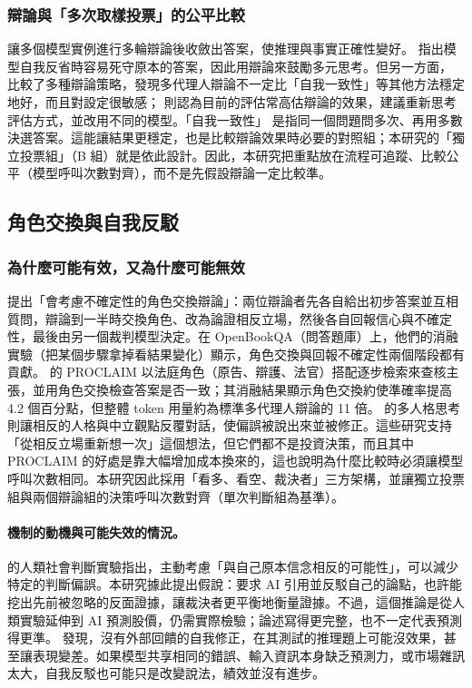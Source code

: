 \documentclass[12pt,a4paper]{article}
\numberwithin{table}{section}
\numberwithin{figure}{section}
\begin{document}
\subsubsection{辯論與「多次取樣投票」的公平比較}
\citet{du2023debate} 讓多個模型實例進行多輪辯論後收斂出答案，使推理與事實正確性變好。\citet{liang2023divergent} 指出模型自我反省時容易死守原本的答案，因此用辯論來鼓勵多元思考。但另一方面，\citet{smit2023mad} 比較了多種辯論策略，發現多代理人辯論不一定比「自我一致性」等其他方法穩定地好，而且對設定很敏感；\citet{zhang2025stop} 則認為目前的評估常高估辯論的效果，建議重新思考評估方式，並改用不同的模型。「自我一致性」\citep{wang2023selfconsistency} 是指同一個問題問多次、再用多數決選答案。這能讓結果更穩定，也是比較辯論效果時必要的對照組；本研究的「獨立投票組」（B 組）就是依此設計。因此，本研究把重點放在流程可追蹤、比較公平（模型呼叫次數對齊），而不是先假設辯論一定比較準。
\subsection{角色交換與自我反駁}

\subsubsection{為什麼可能有效，又為什麼可能無效}
\citet{liu2025roleswitch} 提出「會考慮不確定性的角色交換辯論」：兩位辯論者先各自給出初步答案並互相質問，辯論到一半時交換角色、改為論證相反立場，然後各自回報信心與不確定性，最後由另一個裁判模型決定。在 OpenBookQA（問答題庫）上，他們的消融實驗（把某個步驟拿掉看結果變化）顯示，角色交換與回報不確定性兩個階段都有貢獻。\citet{chowdhury2026proclaim} 的 PROCLAIM 以法庭角色（原告、辯護、法官）搭配逐步檢索來查核主張，並用角色交換檢查答案是否一致；其消融結果顯示角色交換約使準確率提高 4.2 個百分點，但整體 token 用量約為標準多代理人辯論的 11 倍。\citet{chen2026mpt} 的多人格思考則讓相反的人格與中立觀點反覆對話，使偏誤被說出來並被修正。這些研究支持「從相反立場重新想一次」這個想法，但它們都不是投資決策，而且其中 PROCLAIM 的好處是靠大幅增加成本換來的，這也說明為什麼比較時必須讓模型呼叫次數相同。本研究因此採用「看多、看空、裁決者」三方架構，並讓獨立投票組與兩個辯論組的決策呼叫次數對齊（單次判斷組為基準）。\paragraph{機制的動機與可能失效的情況。}
\citet{lord1984opposite} 的人類社會判斷實驗指出，主動考慮「與自己原本信念相反的可能性」，可以減少特定的判斷偏誤。本研究據此提出假說：要求 AI 引用並反駁自己的論點，也許能挖出先前被忽略的反面證據，讓裁決者更平衡地衡量證據。不過，這個推論是從人類實驗延伸到 AI 預測股價，仍需實際檢驗；論述寫得更完整，也不一定代表預測得更準。\citet{huang2024selfcorrect} 發現，沒有外部回饋的自我修正，在其測試的推理題上可能沒效果，甚至讓表現變差。如果模型共享相同的錯誤、輸入資訊本身缺乏預測力，或市場雜訊太大，自我反駁也可能只是改變說法，績效並沒有進步。
\end{document}
